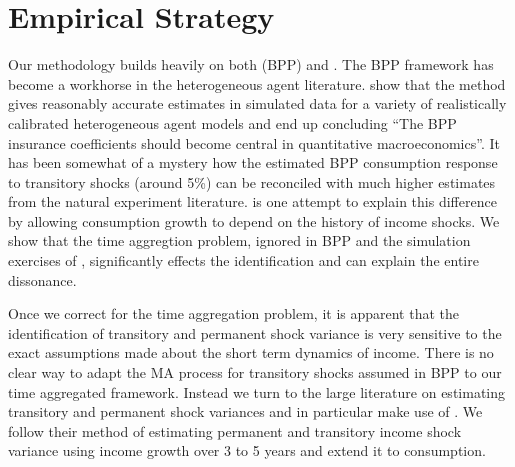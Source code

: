 \documentclass[titlepage]{\econtex}\newcommand{\texname}{IncomeUncertainty}
\begin{document}
\section{Empirical Strategy} \label{empirical_strategy}
Our methodology builds heavily on both \cite{blundell_consumption_2008} (BPP) and \cite{carroll_nature_1997}. The BPP framework has become a workhorse in the heterogeneous agent literature. \cite{kaplan_how_2010} show that the method gives reasonably accurate estimates in simulated data for a variety of realistically calibrated heterogeneous agent models and end up concluding ``The BPP insurance coefficients should become central in quantitative macroeconomics''. It has been somewhat of a mystery how the estimated BPP consumption response to transitory shocks (around 5\%) can be reconciled with much higher estimates from the natural experiment literature. \cite{commault_how_2017} is one attempt to explain this difference by allowing consumption growth to depend on the history of income shocks. We show that the time aggregtion problem, ignored in BPP and the simulation exercises of \cite{kaplan_how_2010}, significantly effects the identification and can explain the entire dissonance.

Once we correct for the time aggregation problem, it is apparent that the identification of transitory and permanent shock variance is very sensitive to the exact assumptions made about the short term dynamics of income. There is no clear way to adapt the MA process for transitory shocks assumed in BPP to our time aggregated framework. Instead we turn to the large literature on estimating transitory and permanent shock variances and in particular make use of \cite{carroll_nature_1997}. We follow their method of estimating permanent and transitory income shock variance using income growth over 3 to 5 years and extend it to consumption.
\end{document}

